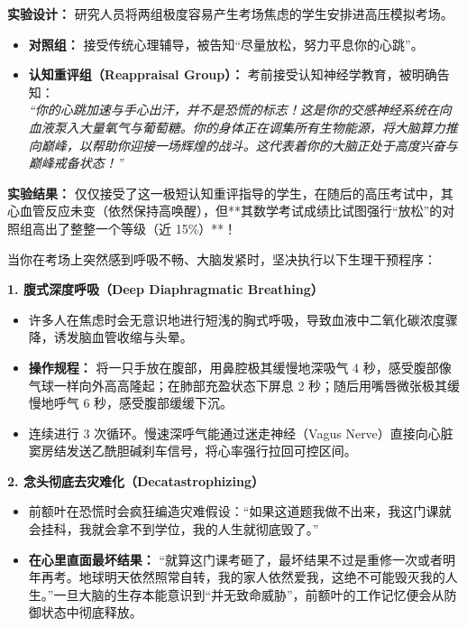 \documentclass[12pt,a4paper,openany]{ctexbook}
\begin{document}
\begin{casebox}[贝洛克的考场认知重评实验]
\textbf{实验设计：} 
研究人员将两组极度容易产生考场焦虑的学生安排进高压模拟考场。
\begin{itemize}
    \item \textbf{对照组：} 接受传统心理辅导，被告知“尽量放松，努力平息你的心跳”。
    \item \textbf{认知重评组（Reappraisal Group）：} 考前接受认知神经学教育，被明确告知：\\
    \emph{“你的心跳加速与手心出汗，并不是恐慌的标志！这是你的交感神经系统在向血液泵入大量氧气与葡萄糖。你的身体正在调集所有生物能源，将大脑算力推向巅峰，以帮助你迎接一场辉煌的战斗。这代表着你的大脑正处于高度兴奋与巅峰戒备状态！”}
\end{itemize}

\textbf{实验结果：}
仅仅接受了这一极短认知重评指导的学生，在随后的高压考试中，其心血管反应未变（依然保持高唤醒），但**其数学考试成绩比试图强行“放松”的对照组高出了整整一个等级（近 15\%）**！
\end{casebox}

\begin{practicebox}[考场急性恐慌生理降噪指南]
当你在考场上突然感到呼吸不畅、大脑发紧时，坚决执行以下生理干预程序：

\textbf{1. 腹式深度呼吸（Deep Diaphragmatic Breathing）}
\begin{itemize}
    \item 许多人在焦虑时会无意识地进行短浅的胸式呼吸，导致血液中二氧化碳浓度骤降，诱发脑血管收缩与头晕。
    \item \textbf{操作规程：} 将一只手放在腹部，用鼻腔极其缓慢地深吸气 4 秒，感受腹部像气球一样向外高高隆起；在肺部充盈状态下屏息 2 秒；随后用嘴唇微张极其缓慢地呼气 6 秒，感受腹部缓缓下沉。
    \item 连续进行 3 次循环。慢速深呼气能通过迷走神经（Vagus Nerve）直接向心脏窦房结发送乙酰胆碱刹车信号，将心率强行拉回可控区间。
\end{itemize}

\textbf{2. 念头彻底去灾难化（Decatastrophizing）}
\begin{itemize}
    \item 前额叶在恐慌时会疯狂编造灾难假设：“如果这道题我做不出来，我这门课就会挂科，我就会拿不到学位，我的人生就彻底毁了。”
    \item \textbf{在心里直面最坏结果：} “就算这门课考砸了，最坏结果不过是重修一次或者明年再考。地球明天依然照常自转，我的家人依然爱我，这绝不可能毁灭我的人生。”一旦大脑的生存本能意识到“并无致命威胁”，前额叶的工作记忆便会从防御状态中彻底释放。
\end{itemize}
\end{practicebox}
\end{document}
